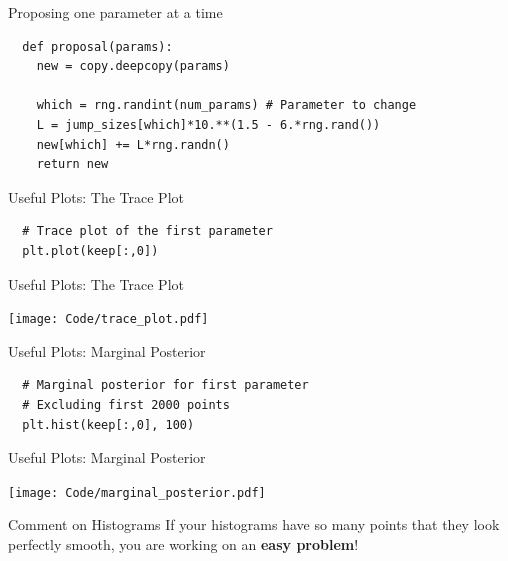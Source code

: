 \begin{frame}[t, fragile]{Proposing one parameter at a time}
\begin{verbatim}
  def proposal(params):
    new = copy.deepcopy(params)

    which = rng.randint(num_params) # Parameter to change
    L = jump_sizes[which]*10.**(1.5 - 6.*rng.rand())
    new[which] += L*rng.randn()
    return new
\end{verbatim}
\end{frame}



\begin{frame}[t, fragile]{Useful Plots: The Trace Plot}
\begin{verbatim}
  # Trace plot of the first parameter
  plt.plot(keep[:,0])
\end{verbatim}
\end{frame}

\begin{frame}[t]{Useful Plots: The Trace Plot}
\begin{center}
\texttt{[image: Code/trace\_plot.pdf]}
\end{center}
\end{frame}


\begin{frame}[t, fragile]{Useful Plots: Marginal Posterior}
\begin{verbatim}
  # Marginal posterior for first parameter
  # Excluding first 2000 points
  plt.hist(keep[:,0], 100)
\end{verbatim}
\end{frame}

\begin{frame}[t]{Useful Plots: Marginal Posterior}
\begin{center}
\texttt{[image: Code/marginal\_posterior.pdf]}
\end{center}
\end{frame}

\begin{frame}[t]{Comment on Histograms}
If your histograms have so many points that they look perfectly smooth, you
are working on an {\bf easy problem}!
\end{frame}


